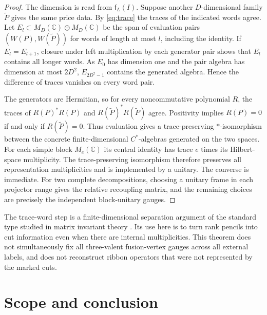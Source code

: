 \documentclass[11pt]{article}
\numberwithin{equation}{section}
\theoremstyle{definition}
\theoremstyle{remark}
\newcommand{\FF}{\mathbb C}
\begin{document}
\begin{proof}
The dimension is read from \(\mathsf f_L(I)\). Suppose another \(D\)-dimensional family \(\widetilde P\) gives the same price data. By \eqref{eq:trace} the traces of the indicated words agree. Let \(E_l\subset M_D(\FF)\oplus M_D(\FF)\) be the span of evaluation pairs \((W(P),W(\widetilde P))\) for words of length at most \(l\), including the identity. If \(E_l=E_{l+1}\), closure under left multiplication by each generator pair shows that \(E_l\) contains all longer words. As \(E_0\) has dimension one and the pair algebra has dimension at most \(2D^2\), \(E_{2D^2-1}\) contains the generated algebra. Hence the difference of traces vanishes on every word pair.

The generators are Hermitian, so for every noncommutative polynomial \(R\), the traces of \(R(P)^*R(P)\) and \(R(\widetilde P)^*R(\widetilde P)\) agree. Positivity implies \(R(P)=0\) if and only if \(R(\widetilde P)=0\). Thus evaluation gives a trace-preserving \(*\)-isomorphism between the concrete finite-dimensional \(C^*\)-algebras generated on the two spaces. For each simple block \(M_e(\FF)\) its central identity has trace \(e\) times its Hilbert-space multiplicity. The trace-preserving isomorphism therefore preserves all representation multiplicities and is implemented by a unitary. The converse is immediate. For two complete decompositions, choosing a unitary frame in each projector range gives the relative recoupling matrix, and the remaining choices are precisely the independent block-unitary gauges.
\end{proof}

The trace-word step is a finite-dimensional separation argument of the standard type studied in matrix invariant theory \cite{Procesi}. Its use here is to turn rank pencils into cut information even when there are internal multiplicities. This theorem does not simultaneously fix all three-valent fusion-vertex gauges across all external labels, and does not reconstruct ribbon operators that were not represented by the marked cuts.



\section{Scope and conclusion}\label{sec:conclusion}
\end{document}
